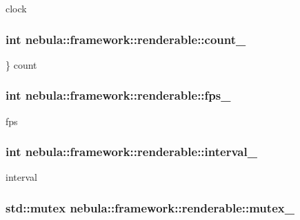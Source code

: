 clock \hypertarget{classnebula_1_1framework_1_1renderable_aa422953fdf36a303d11a46e423121c49}{
\subsubsection[{count\_\-}]{\setlength{\rightskip}{0pt plus 5cm}int {\bf nebula::framework::renderable::count\_\-}}}
\label{classnebula_1_1framework_1_1renderable_aa422953fdf36a303d11a46e423121c49}


\} count \hypertarget{classnebula_1_1framework_1_1renderable_a5ce9a6025af9a419cd3bee66cb006d50}{
\subsubsection[{fps\_\-}]{\setlength{\rightskip}{0pt plus 5cm}int {\bf nebula::framework::renderable::fps\_\-}}}
\label{classnebula_1_1framework_1_1renderable_a5ce9a6025af9a419cd3bee66cb006d50}


fps \hypertarget{classnebula_1_1framework_1_1renderable_af1f8fddc12fee8df07dfb1738ebf31f9}{
\subsubsection[{interval\_\-}]{\setlength{\rightskip}{0pt plus 5cm}int {\bf nebula::framework::renderable::interval\_\-}}}
\label{classnebula_1_1framework_1_1renderable_af1f8fddc12fee8df07dfb1738ebf31f9}


interval \hypertarget{classnebula_1_1framework_1_1renderable_ae996fad7ef87ef7f99501795192d9b13}{
\subsubsection[{mutex\_\-}]{\setlength{\rightskip}{0pt plus 5cm}std::mutex {\bf nebula::framework::renderable::mutex\_\-}}}
\label{classnebula_1_1framework_1_1renderable_ae996fad7ef87ef7f99501795192d9b13}


